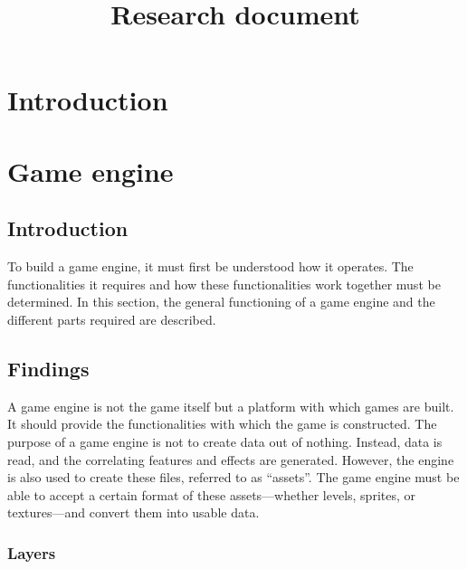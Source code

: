 \documentclass{projdoc}
\title{Research document}
\begin{document}
\tablestables
\newpage

\section{Introduction}

\section{Game engine}

\subsection{Introduction}

To build a game engine, it must first be understood how it operates. The
functionalities it requires and how these functionalities work together must be
determined. In this section, the general functioning of a game engine and the
different parts required are described.

\subsection{Findings}

A game engine is not the game itself but a platform with which games are built. It
should provide the functionalities with which the game is constructed. The purpose of
a game engine is not to create data out of nothing. Instead, data is read, and the
correlating features and effects are generated. However, the engine is also used to
create these files, referred to as ``assets''. The game engine must be able to accept
a certain format of these assets---whether levels, sprites, or textures---and convert
them into usable data.

\subsubsection{Layers}
\end{document}
